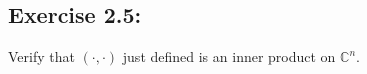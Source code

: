 \begin{flushleft}
\setcounter{equation}{0}
\section{\Large Exercise 2.5:}
Verify that $(\cdot, \cdot)$ just defined is an inner product on $\mathbb{C}^n$.
\end{flushleft}
